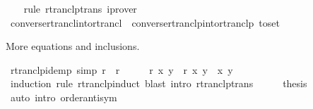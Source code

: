 \begin{isabellebody}
%
\isadelimproof
\ \ %
\endisadelimproof
%
\isatagproof
{}\isamarkupfalse%
\ {\isacharparenleft}{\kern0pt}rule\ rtranclp{\isacharunderscore}{\kern0pt}trans{\isacharparenright}{\kern0pt}\ iprover{\isacharplus}{\kern0pt}%
\endisatagproof
{\isafoldproof}%
%
\isadelimproof
\isanewline
%
\endisadelimproof
\isanewline
{}\isamarkupfalse%
\ converse{\isacharunderscore}{\kern0pt}rtrancl{\isacharunderscore}{\kern0pt}into{\isacharunderscore}{\kern0pt}rtrancl\ {\isacharequal}{\kern0pt}\ converse{\isacharunderscore}{\kern0pt}rtranclp{\isacharunderscore}{\kern0pt}into{\isacharunderscore}{\kern0pt}rtranclp\ {\isacharbrackleft}{\kern0pt}to{\isacharunderscore}{\kern0pt}set{\isacharbrackright}{\kern0pt}%
\begin{isamarkuptext}%
\medskip More  equations and inclusions.%
\end{isamarkuptext}\isamarkuptrue%
\isamarkupfalse%
\ rtranclp{\isacharunderscore}{\kern0pt}idemp\ {\isacharbrackleft}{\kern0pt}simp{\isacharbrackright}{\kern0pt}{\isacharcolon}{\kern0pt}\ {\isachardoublequoteopen}{\isacharparenleft}{\kern0pt}r\isactrlsup {\isacharasterisk}{\kern0pt}\isactrlsup {\isacharasterisk}{\kern0pt}{\isacharparenright}{\kern0pt}\isactrlsup {\isacharasterisk}{\kern0pt}\isactrlsup {\isacharasterisk}{\kern0pt}\ {\isacharequal}{\kern0pt}\ r\isactrlsup {\isacharasterisk}{\kern0pt}\isactrlsup {\isacharasterisk}{\kern0pt}{\isachardoublequoteclose}\isanewline
%
\isadelimproof
%
\endisadelimproof
%
\isatagproof
{}\isamarkupfalse%
\ {\isacharminus}{\kern0pt}\isanewline
\ \ \isamarkupfalse%
\ {\isachardoublequoteopen}r\isactrlsup {\isacharasterisk}{\kern0pt}\isactrlsup {\isacharasterisk}{\kern0pt}\isactrlsup {\isacharasterisk}{\kern0pt}\isactrlsup {\isacharasterisk}{\kern0pt}\ x\ y\ {\isasymLongrightarrow}\ r\isactrlsup {\isacharasterisk}{\kern0pt}\isactrlsup {\isacharasterisk}{\kern0pt}\ x\ y{\isachardoublequoteclose}\ \ x\ y\isanewline
\ \ \ \ \isamarkupfalse%
\ {\isacharparenleft}{\kern0pt}induction\ rule{\isacharcolon}{\kern0pt}\ rtranclp{\isacharunderscore}{\kern0pt}induct{\isacharparenright}{\kern0pt}\ {\isacharparenleft}{\kern0pt}blast\ intro{\isacharcolon}{\kern0pt}\ rtranclp{\isacharunderscore}{\kern0pt}trans{\isacharparenright}{\kern0pt}{\isacharplus}{\kern0pt}\isanewline
\ \ \isamarkupfalse%
\ \isamarkupfalse%
\ {\isacharquery}{\kern0pt}thesis\isanewline
\ \ \ \ \isamarkupfalse%
\ {\isacharparenleft}{\kern0pt}auto\ intro{\isacharbang}{\kern0pt}{\isacharcolon}{\kern0pt}\ order{\isacharunderscore}{\kern0pt}antisym{\isacharparenright}{\kern0pt}\isanewline

\end{isabellebody}
